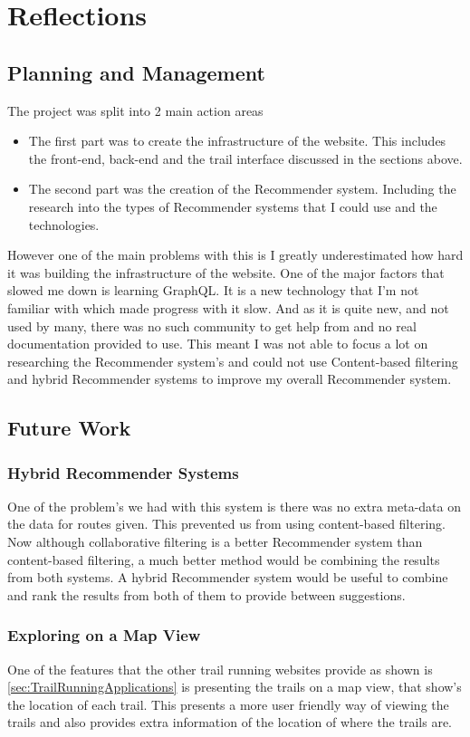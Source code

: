 \chapter{Reflections}
\section{Planning and Management}
The project was split into 2 main action areas
\begin{itemize}
    \item The first part was to create the infrastructure of the website. This includes the \gls{front-end}, \gls{back-end} and the trail interface discussed in the sections above.
    \item The second part was the creation of the Recommender system. Including the research into the types of Recommender systems that I could use and the technologies.
\end{itemize}

However one of the main problems with this is I greatly underestimated how hard it was building the infrastructure of the website. One of the major factors that slowed me down is learning GraphQL. It is a new technology that I'm not familiar with which made progress with it slow. And as it is quite new, and not used by many, there was no such community to get help from and no real documentation provided to use. This meant I was not able to focus a lot on researching the Recommender system's and could not use Content-based filtering and hybrid Recommender systems to improve my overall Recommender system.

\section{Future Work}
\subsection{Hybrid Recommender Systems}
One of the problem's we had with this system is there was no extra meta-data on the data for routes given. This prevented us from using content-based filtering. Now although collaborative filtering is a better Recommender system than content-based filtering, a much better method would be combining the results from both systems. A hybrid Recommender system would be useful to combine and rank the results from both of them to provide between suggestions.

\subsection{Exploring on a Map View}
One of the features that the other trail running websites provide as shown is \autoref{sec:TrailRunningApplications} is presenting the trails on a map view, that show's the location of each trail. This presents a more user friendly way of viewing the trails and also provides extra information of the location of where the trails are.

